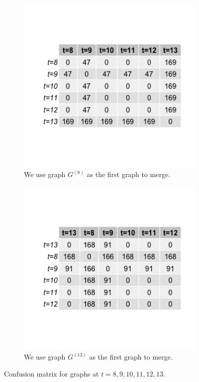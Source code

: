 \documentclass[12pt]{article}
\numberwithin{equation}{section}
\theoremstyle{definition}
\begin{document}
\begin{figure}[h]
\begin{subfigure}{.48\linewidth}
\centering
\includegraphics[trim=1cm 2cm 1cm 2cm,clip=true,width=1\textwidth]{t=8_13with8first.png}
\caption{We use graph $G^{(8)}$ as the first graph to merge.}
\label{fig:sub8}
\end{subfigure}%
\hspace{5mm}
\begin{subfigure}{.48\linewidth}
\centering
\includegraphics[trim=1cm 2cm 1cm 2cm, clip=true, width=1\textwidth,]{t=13_8with13first.png}
\caption{We use graph $G^{(13)}$ as the first graph to merge.}
\label{fig:sub9}
\end{subfigure}
\caption{Confusion matrix for graphs at $t=8,9,10,11,12,13$.}
\label{fig:fig7}
\end{figure}
\end{document}
